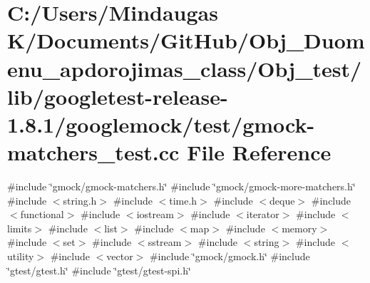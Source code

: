 \hypertarget{_obj__test_2lib_2googletest-release-1_88_81_2googlemock_2test_2gmock-matchers__test_8cc}{}\section{C\+:/\+Users/\+Mindaugas K/\+Documents/\+Git\+Hub/\+Obj\+\_\+\+Duomenu\+\_\+apdorojimas\+\_\+class/\+Obj\+\_\+test/lib/googletest-\/release-\/1.8.1/googlemock/test/gmock-\/matchers\+\_\+test.cc File Reference}
\label{_obj__test_2lib_2googletest-release-1_88_81_2googlemock_2test_2gmock-matchers__test_8cc}
{\ttfamily \#include \char`\"{}gmock/gmock-\/matchers.\+h\char`\"{}}\newline
{\ttfamily \#include \char`\"{}gmock/gmock-\/more-\/matchers.\+h\char`\"{}}\newline
{\ttfamily \#include $<$string.\+h$>$}\newline
{\ttfamily \#include $<$time.\+h$>$}\newline
{\ttfamily \#include $<$deque$>$}\newline
{\ttfamily \#include $<$functional$>$}\newline
{\ttfamily \#include $<$iostream$>$}\newline
{\ttfamily \#include $<$iterator$>$}\newline
{\ttfamily \#include $<$limits$>$}\newline
{\ttfamily \#include $<$list$>$}\newline
{\ttfamily \#include $<$map$>$}\newline
{\ttfamily \#include $<$memory$>$}\newline
{\ttfamily \#include $<$set$>$}\newline
{\ttfamily \#include $<$sstream$>$}\newline
{\ttfamily \#include $<$string$>$}\newline
{\ttfamily \#include $<$utility$>$}\newline
{\ttfamily \#include $<$vector$>$}\newline
{\ttfamily \#include \char`\"{}gmock/gmock.\+h\char`\"{}}\newline
{\ttfamily \#include \char`\"{}gtest/gtest.\+h\char`\"{}}\newline
{\ttfamily \#include \char`\"{}gtest/gtest-\/spi.\+h\char`\"{}}\newline
